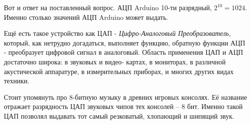 \documentclass[../sparc.tex]{subfiles}
\begin{document}
Вот и ответ на поставленный вопрос. АЦП Arduino 10-ти разрядный, $2^{10} = 1024$.
Именно столько значений АЦП Arduino может выдать.

Ещё есть такое устройство как ЦАП - \emph{Цифро-Аналоговый Преобразователь},
который, как нетрудно догадаться, выполняет функцию, обратную функции АЦП -
преобразует цифровой сигнал в аналоговый. Область применения ЦАП и АЦП
достаточно широка: в звуковых и видео- картах, в мониторах, в различной
акустической аппаратуре, в измерительных приборах, и многих других видах
техники.

Стоит упомянуть про 8-битную музыку в древних игровых консолях. Её название
отражает разрядность ЦАП звуковых чипов тех консолей -- 8 бит. Именно такой ЦАП
позволял выдавать тот самый резковатый, хлопающий и шипящий звук.
\end{document}
